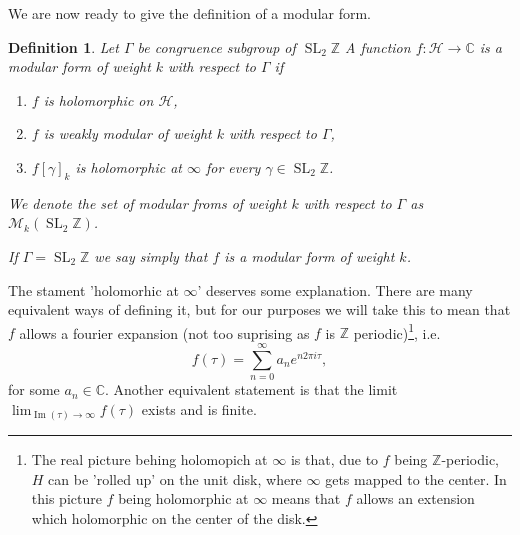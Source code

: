 \documentclass[a4paper]{article}
\theoremstyle{theoremdd}
\theoremstyle{definitiondd}
\newtheorem{definition}[theorem]{Definition}
\theoremstyle{remarkdd}
\newcommand{\Z}{\mathbb{Z}}
\newcommand{\C}{\mathbb{C}}
\DeclareMathOperator{\im}{Im}
\DeclareMathOperator{\SL}{SL}
\begin{document}
We are now ready to give the definition of a modular form. 
\begin{definition}\label{def:modular_form}
	Let $\Gamma$ be congruence subgroup of $\SL_2\Z$
	A function $f: \mathcal{H}  \to \C$ is a \emph{modular form of weight $ k$ with respect to $\Gamma$} if 
	\begin{enumerate}
		\item $f$ is holomorphic on $\mathcal{H} $,
		\item $f$ is weakly modular of weight $k$ with respect to $\Gamma$, 
		\item $f[\gamma]_k$ is holomorphic at $\infty$ for every $\gamma \in \SL_2\Z$. 
	\end{enumerate}
	We denote the set of modular froms of weight $k$ with respect to $\Gamma$ as $\mathcal{M} _k(\SL_2\Z)$. 
	
	If $\Gamma = \SL_2\Z$ we say simply that $f$ is a modular form of weight $k$. 
\end{definition}
The stament 'holomorhic at $\infty$' deserves some explanation. There are many equivalent ways of defining it, but for our purposes we will take this to mean that $f$ allows a fourier expansion (not too suprising as  $f$ is $\Z$ periodic)\footnote{The real picture behing holomopich at $\infty$ is that, due to $f$ being $\Z$-periodic, $H$ can be 'rolled up' on the unit disk, where $\infty$ gets mapped to the center. In this picture  $f$ being holomorphic at $\infty$ means that  $f$ allows an extension which holomorphic on the center of the disk.}, i.e.\ \[
	f(\tau) = \sum_{n=0}^{\infty} a_n e^{n 2\pi i \tau}
,\]
for some $a_n \in \C$.
Another equivalent statement is that the limit $\lim_{\im(\tau) \to \infty} f(\tau)$ exists and is finite.
\end{document}
